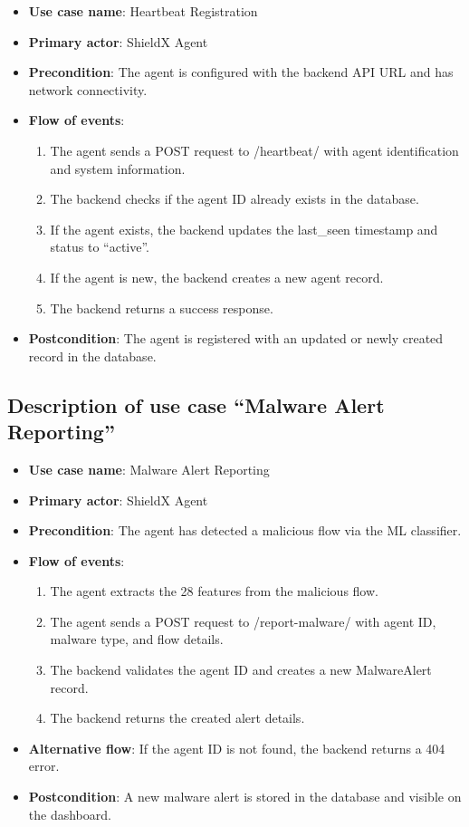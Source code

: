 \documentclass[../Main.tex]{subfiles}
\begin{document}
\begin{itemize}
    \item \textbf{Use case name}: Heartbeat Registration
    \item \textbf{Primary actor}: ShieldX Agent
    \item \textbf{Precondition}: The agent is configured with the backend API URL and has network connectivity.
    \item \textbf{Flow of events}:
        \begin{enumerate}
            \item The agent sends a POST request to /heartbeat/ with agent identification and system information.
            \item The backend checks if the agent ID already exists in the database.
            \item If the agent exists, the backend updates the last\_seen timestamp and status to ``active''.
            \item If the agent is new, the backend creates a new agent record.
            \item The backend returns a success response.
        \end{enumerate}
    \item \textbf{Postcondition}: The agent is registered with an updated or newly created record in the database.
\end{itemize}

\subsection{Description of use case ``Malware Alert Reporting''}

\begin{itemize}
    \item \textbf{Use case name}: Malware Alert Reporting
    \item \textbf{Primary actor}: ShieldX Agent
    \item \textbf{Precondition}: The agent has detected a malicious flow via the ML classifier.
    \item \textbf{Flow of events}:
        \begin{enumerate}
            \item The agent extracts the 28 features from the malicious flow.
            \item The agent sends a POST request to /report-malware/ with agent ID, malware type, and flow details.
            \item The backend validates the agent ID and creates a new MalwareAlert record.
            \item The backend returns the created alert details.
        \end{enumerate}
    \item \textbf{Alternative flow}: If the agent ID is not found, the backend returns a 404 error.
    \item \textbf{Postcondition}: A new malware alert is stored in the database and visible on the dashboard.
\end{itemize}
\end{document}

